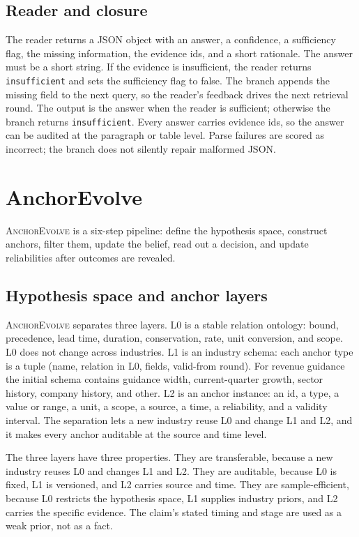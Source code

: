 \documentclass[11pt]{article}
\newcommand{\anchor}{\textsc{AnchorEvolve}}
\begin{document}
\subsection{Reader and closure}
The reader returns a JSON object with an answer, a confidence, a sufficiency flag, the missing information, the evidence ids, and a short rationale. The answer must be a short string. If the evidence is insufficient, the reader returns \texttt{insufficient} and sets the sufficiency flag to false. The branch appends the missing field to the next query, so the reader's feedback drives the next retrieval round. The output is the answer when the reader is sufficient; otherwise the branch returns \texttt{insufficient}. Every answer carries evidence ids, so the answer can be audited at the paragraph or table level. Parse failures are scored as incorrect; the branch does not silently repair malformed JSON.

\section{AnchorEvolve}
\label{sec:anchor}

\anchor{} is a six-step pipeline: define the hypothesis space, construct anchors, filter them, update the belief, read out a decision, and update reliabilities after outcomes are revealed.

\subsection{Hypothesis space and anchor layers}
\anchor{} separates three layers. L0 is a stable relation ontology: bound, precedence, lead time, duration, conservation, rate, unit conversion, and scope. L0 does not change across industries. L1 is an industry schema: each anchor type is a tuple (name, relation in L0, fields, valid-from round). For revenue guidance the initial schema contains guidance width, current-quarter growth, sector history, company history, and other. L2 is an anchor instance: an id, a type, a value or range, a unit, a scope, a source, a time, a reliability, and a validity interval. The separation lets a new industry reuse L0 and change L1 and L2, and it makes every anchor auditable at the source and time level.

The three layers have three properties. They are transferable, because a new industry reuses L0 and changes L1 and L2. They are auditable, because L0 is fixed, L1 is versioned, and L2 carries source and time. They are sample-efficient, because L0 restricts the hypothesis space, L1 supplies industry priors, and L2 carries the specific evidence. The claim's stated timing and stage are used as a weak prior, not as a fact.
\end{document}
